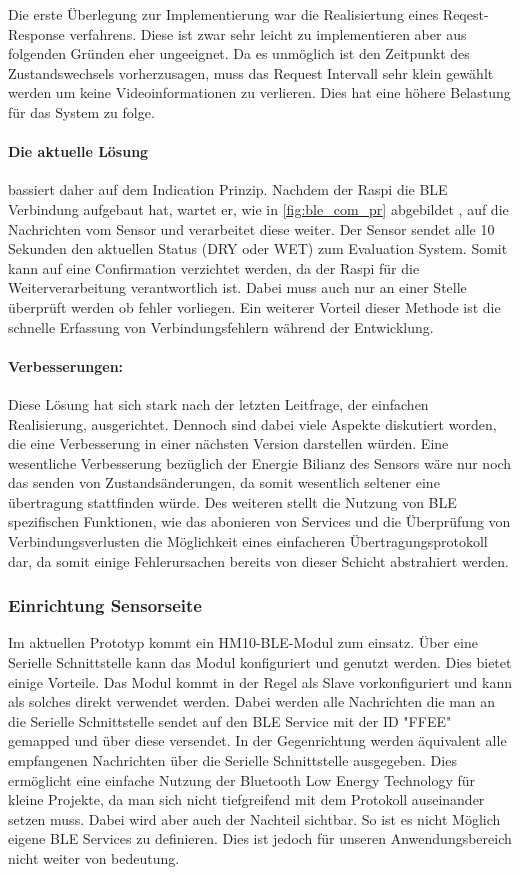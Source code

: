 Die erste Überlegung zur Implementierung war die Realisiertung eines Reqest-Response verfahrens. Diese ist zwar sehr leicht zu implementieren aber aus folgenden Gründen eher ungeeignet. 
Da es unmöglich ist den Zeitpunkt des Zustandswechsels vorherzusagen, muss das Request Intervall sehr klein gewählt werden um keine Videoinformationen zu verlieren. Dies hat eine höhere Belastung für das System zu folge. 

\paragraph{Die aktuelle Lösung} bassiert daher auf dem Indication Prinzip. Nachdem der Raspi die BLE Verbindung aufgebaut hat, wartet er, wie in \ref{fig:ble_com_pr} abgebildet , auf die Nachrichten vom Sensor und verarbeitet diese weiter. Der Sensor sendet alle 10 Sekunden den aktuellen Status (DRY oder WET) zum Evaluation System. Somit kann auf eine Confirmation verzichtet werden, da der Raspi für die Weiterverarbeitung verantwortlich ist. Dabei muss auch nur an einer Stelle überprüft werden ob fehler vorliegen. Ein weiterer Vorteil dieser Methode ist die schnelle Erfassung von Verbindungsfehlern während der Entwicklung.

\paragraph{Verbesserungen:} Diese Lösung hat sich stark nach der letzten Leitfrage, der einfachen Realisierung, ausgerichtet. Dennoch sind dabei viele Aspekte diskutiert worden, die eine Verbesserung in einer nächsten Version darstellen würden. Eine wesentliche Verbesserung bezüglich der Energie Bilianz des Sensors wäre nur noch das senden von Zustandsänderungen, da somit wesentlich seltener eine übertragung stattfinden würde. Des weiteren stellt die Nutzung von BLE spezifischen Funktionen, wie das abonieren von Services und die Überprüfung von Verbindungsverlusten die Möglichkeit eines einfacheren Übertragungsprotokoll dar, da somit einige Fehlerursachen bereits von dieser Schicht abstrahiert werden.

\subsubsection{Einrichtung Sensorseite}
Im aktuellen Prototyp kommt ein HM10-BLE-Modul zum einsatz. Über eine Serielle Schnittstelle kann das Modul konfiguriert und genutzt werden. Dies bietet einige Vorteile. Das Modul kommt in der Regel als Slave vorkonfiguriert und kann als solches direkt verwendet werden. Dabei werden alle Nachrichten die man an die Serielle Schnittstelle sendet auf den BLE Service mit der ID "FFEE" gemapped und über diese versendet. In der Gegenrichtung werden äquivalent alle empfangenen Nachrichten über die Serielle Schnittstelle ausgegeben. Dies ermöglicht eine einfache Nutzung der Bluetooth Low Energy Technology für kleine Projekte, da man sich nicht tiefgreifend mit dem Protokoll auseinander setzen muss. Dabei wird aber auch der Nachteil sichtbar. So ist es nicht Möglich eigene BLE Services zu definieren. Dies ist jedoch für unseren Anwendungsbereich nicht weiter von bedeutung. 

